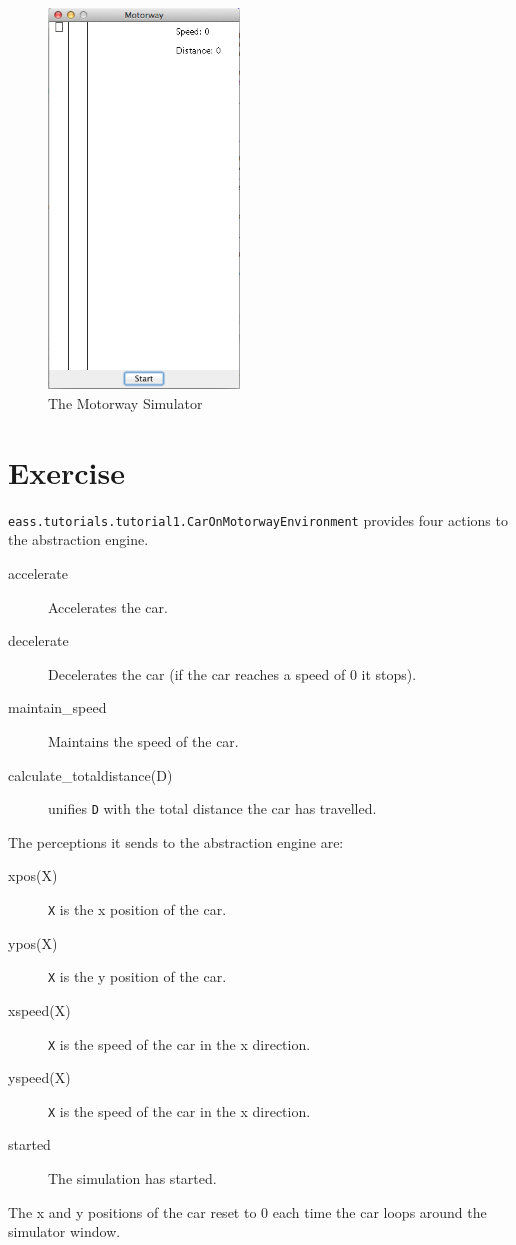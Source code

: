 \documentclass[a4]{article}
\begin{document}
\begin{figure}
\begin{center}
\includegraphics[width=2in]{motorwaysim.png}
\end{center}
\caption{The Motorway Simulator}
\label{fig:motorwaysim}
\end{figure}

\section{Exercise}

\texttt{eass.tutorials.tutorial1.CarOnMotorwayEnvironment} provides four actions to the abstraction engine.
\begin{description}
\item[accelerate] Accelerates the car.
\item[decelerate] Decelerates the car (if the car reaches a speed of 0 it stops).
\item[maintain\_speed] Maintains the speed of the car.
\item[calculate\_totaldistance(D)] unifies \texttt{D} with the total distance the car has travelled.
\end{description}

The perceptions it sends to the abstraction engine are:
\begin{description}
\item[xpos(X)] \texttt{X} is the x position of the car.
\item[ypos(X)] \texttt{X} is the y position of the car.
\item[xspeed(X)] \texttt{X} is the speed of the car in the x direction.
\item[yspeed(X)] \texttt{X} is the  speed of the car in the x direction.
\item[started] The simulation has started.
\end{description}
The x and y positions of the car reset to 0 each time the car loops around the simulator window.
\end{document}
